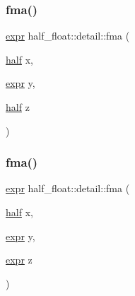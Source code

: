 \mbox{\label{namespacehalf__float_1_1detail_a7c3742da5a38f674945f00920afa5471}} 
\subsubsection{\texorpdfstring{fma()}{fma()}\hspace{0.1cm}{\footnotesize\ttfamily [3/8]}}
{\footnotesize\ttfamily \hyperlink{structhalf__float_1_1detail_1_1expr}{expr} half\+\_\+float\+::detail\+::fma (\begin{DoxyParamCaption}\item[{\hyperlink{classhalf__float_1_1half}{half}}]{x,  }\item[{\hyperlink{structhalf__float_1_1detail_1_1expr}{expr}}]{y,  }\item[{\hyperlink{classhalf__float_1_1half}{half}}]{z }\end{DoxyParamCaption})\hspace{0.3cm}{\ttfamily [inline]}}

\mbox{\label{namespacehalf__float_1_1detail_ab6bd73ba9ce8e0d276b5660add1f3ec3}} 
\subsubsection{\texorpdfstring{fma()}{fma()}\hspace{0.1cm}{\footnotesize\ttfamily [4/8]}}
{\footnotesize\ttfamily \hyperlink{structhalf__float_1_1detail_1_1expr}{expr} half\+\_\+float\+::detail\+::fma (\begin{DoxyParamCaption}\item[{\hyperlink{classhalf__float_1_1half}{half}}]{x,  }\item[{\hyperlink{structhalf__float_1_1detail_1_1expr}{expr}}]{y,  }\item[{\hyperlink{structhalf__float_1_1detail_1_1expr}{expr}}]{z }\end{DoxyParamCaption})\hspace{0.3cm}{\ttfamily [inline]}}

\mbox{\label{namespacehalf__float_1_1detail_a44b4dfdc8a51edd86c0f6c6be1e8c362}} 

